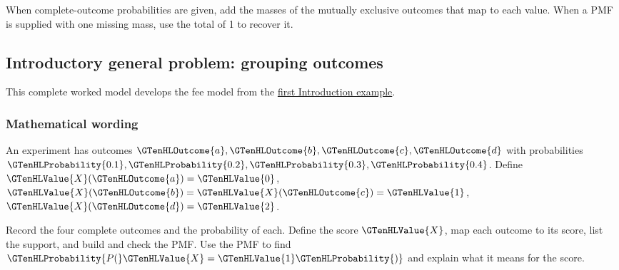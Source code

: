 When complete-outcome probabilities are given, add the masses of the mutually exclusive outcomes that map to each value. When a PMF is supplied with one missing mass, use the total of 1 to recover it.

\subsection{Introductory general problem: grouping outcomes}
\label{subsec:t2-c1-introductory-general-problem-grouping-outcomes}
This complete worked model develops the fee model from the \hyperref[subsec:t2-c1-given-outcomes]{first Introduction example}.

\subsubsection*{Mathematical wording}
An experiment has outcomes $\GTenHLOutcome{a},\GTenHLOutcome{b},\GTenHLOutcome{c},\GTenHLOutcome{d}$ with probabilities $\GTenHLProbability{0.1},\GTenHLProbability{0.2},\GTenHLProbability{0.3},\GTenHLProbability{0.4}$. Define $\GTenHLValue{X}(\GTenHLOutcome{a})=\GTenHLValue{0}$, $\GTenHLValue{X}(\GTenHLOutcome{b})=\GTenHLValue{X}(\GTenHLOutcome{c})=\GTenHLValue{1}$, $\GTenHLValue{X}(\GTenHLOutcome{d})=\GTenHLValue{2}$.

    {Record the four complete outcomes and the probability of each.}
    {Define the score $\GTenHLValue{X}$, map each outcome to its score, list the support, and build and check the PMF.}
    {Use the PMF to find $\GTenHLProbability{P(}\GTenHLValue{X}=\GTenHLValue{1}\GTenHLProbability{)}$ and explain what it means for the score.}

